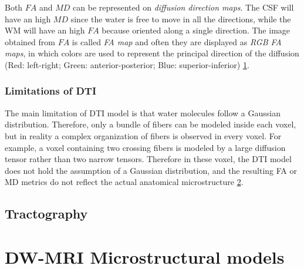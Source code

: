  Both $FA$ and $MD$ can be represented on \emph{diffusion direction maps}. The CSF will have an high $MD$ since the water is free to move in all the directions, while the WM will have an high $FA$ because oriented along a single direction. The image obtained from $FA$ is called \emph{FA map} and often they are displayed as \emph{RGB FA maps}, in which colors are used to represent the principal direction of the diffusion (Red: left-right; Green: anterior-posterior; Blue: superior-inferior) \ref{fig:DTImaps}.

  \begin{figure}[h]
    \centering
    \caption{}
    \label{fig:DTImaps}
 \end{figure}

  \subsubsection*{Limitations of DTI}
  The main limitation of DTI model is that water molecules follow a Gaussian distribution. Therefore, only a bundle of fibers can be modeled inside each voxel, but in reality a complex organization of fibers is observed in every voxel. For example, a voxel containing two crossing fibers is modeled by a large diffusion tensor rather than two narrow tensors. Therefore in these voxel, the DTI model does not hold the assumption of a Gaussian distribution, and the resulting FA or MD metrics do not reflect the actual anatomical microstructure \ref{fig:fiber_crossing}.

  \begin{figure}[h]
      \centering
      \caption{}
      \label{fig:fiber_crossing}
  \end{figure}
 \subsection{Tractography}

\section{DW-MRI Microstructural models}
